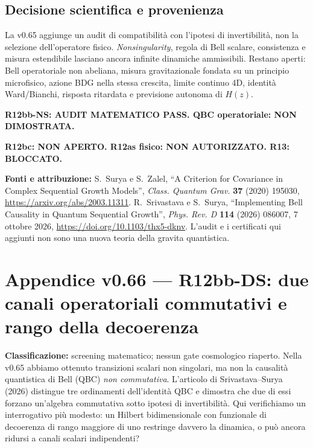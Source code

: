\documentclass[11pt,a4paper]{article}
\begin{document}
\subsection*{Decisione scientifica e provenienza}
La v0.65 aggiunge un audit di compatibilit\`a con l'ipotesi di invertibilit\`a, non la selezione dell'operatore fisico. \emph{Nonsingularity}, regola di Bell scalare, consistenza e misura estendibile lasciano ancora infinite dinamiche ammissibili. Restano aperti: Bell operatoriale non abeliana, misura gravitazionale fondata su un principio microfisico, azione BDG nella stessa crescita, limite continuo 4D, identit\`a Ward/Bianchi, risposta ritardata e previsione autonoma di $H(z)$.

\textbf{R12bb-NS: AUDIT MATEMATICO PASS. QBC operatoriale: NON DIMOSTRATA.}

\textbf{R12bc: NON APERTO. R12as fisico: NON AUTORIZZATO. R13: BLOCCATO.}

\textbf{Fonti e attribuzione:} S.~Surya e S.~Zalel, ``A Criterion for Covariance in Complex Sequential Growth Models'', \emph{Class. Quantum Grav.} \textbf{37} (2020) 195030, \url{https://arxiv.org/abs/2003.11311}. R.~Srivastava e S.~Surya, ``Implementing Bell Causality in Quantum Sequential Growth'', \emph{Phys. Rev. D} \textbf{114} (2026) 086007, 7 ottobre 2026, \url{https://doi.org/10.1103/thx5-dknv}. L'audit e i certificati qui aggiunti non sono una nuova teoria della gravita quantistica.




\clearpage
\section*{Appendice v0.66 --- R12bb-DS: due canali operatoriali commutativi e rango della decoerenza}
\textbf{Classificazione:} screening matematico; nessun gate cosmologico riaperto. Nella v0.65 abbiamo ottenuto transizioni scalari non singolari, ma non la causalit\`a quantistica di Bell (QBC) \emph{non commutativa}. L'articolo di Srivastava--Surya (2026) distingue tre ordinamenti dell'identit\`a QBC e dimostra che due di essi forzano un'algebra commutativa sotto ipotesi di invertibilit\`a. Qui verifichiamo un interrogativo pi\`u modesto: un Hilbert bidimensionale con funzionale di decoerenza di rango maggiore di uno restringe davvero la dinamica, o pu\`o ancora ridursi a canali scalari indipendenti?
\end{document}
